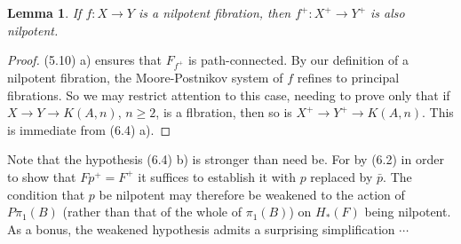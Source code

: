 \documentclass[openany,leqno]{book}  %
\newtheorem{lemma}[theorem]{Lemma}
\begin{document}
\begin{lemma}
  If $f\colon  X\longrightarrow Y$ is a nilpotent fibration, then $f^+\colon  X^+\longrightarrow Y^+$ is also nilpotent.
\end{lemma}
\begin{proof}
 (5.10) a) ensures that $F_{f^+}$ is path-connected. By our definition of a nilpotent fibration,  the Moore-Postnikov system of $f$ refines to principal fibrations. So we may restrict attention to this case, needing to prove only that if $X \longrightarrow Y \longrightarrow K(A,n)$, $n \geqslant 2$, is a flbration, then so is $X^+ \longrightarrow Y^+ \longrightarrow K(A,n)$. This is immediate from (6.4) a).
 \end{proof}
  
Note that the hypothesis (6.4) b) is stronger than need be. For by (6.2) in order to show that $F{p^+} = F^+$ it suffices to establish it with $p$ replaced by $\bar{p}$. The condition that $p$ be nilpotent may therefore be weakened to the action of $P\pi_1(B)$ (rather than that of the whole of $\pi_1(B)$) on $H_*(F)$ being nilpotent. As a bonus, the weakened hypothesis admits a surprising simplification $\cdots$
\end{document}
